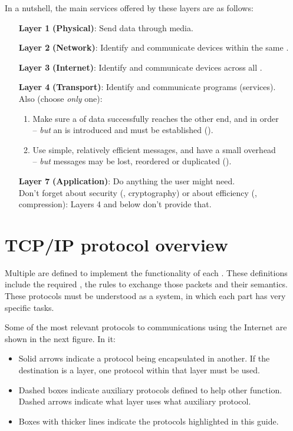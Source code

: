 In a nutshell, the main services offered by these layers are as follows:
\begin{enumerate}
\item[\textbf{Layer 1}] \textbf{(Physical)}: 
  Send  data through  media.
\item[\textbf{Layer 2}] \textbf{(Network)}:
  Identify and communicate devices within the same .
\item[\textbf{Layer 3}] \textbf{(Internet)}:
  Identify and communicate devices across all .
\item[\textbf{Layer 4}] \textbf{(Transport)}:
  Identify and communicate programs (services).\\
  Also (choose \textit{only} one):
  \begin{enumerate}[label=\alph*)]
   \item Make sure a  of data successfully reaches the other end, 
   and in order \\-- \textit{but} an  is introduced 
   and  must be established ().
     
   \item Use simple, relatively efficient messages, and have a small overhead\\
   -- \textit{but} messages may be lost, reordered or duplicated ().
  \end{enumerate}
\item[\textbf{Layer 7}] \textbf{(Application)}:
  Do anything the user might need. \\
  Don't forget about security (\eg, cryptography) 
  or about efficiency (\eg, compression): Layers 4 and below don't provide that.
\end{enumerate}

\section{TCP/IP protocol overview}

Multiple  are defined to implement the functionality
of each . These definitions include the required ,
the rules to exchange those packets and their semantics.
% 
These protocols must be understood as a system, in which each part has very specific tasks.

Some of the most relevant protocols to communications using the Internet 
are shown in the next figure. In it:
\begin{itemize}
\item Solid arrows indicate a protocol being encapsulated in another. 
  If the destination is a layer, one protocol within that layer must be used.

\item Dashed boxes indicate auxiliary protocols defined to help other function. 
Dashed arrows indicate what layer uses what auxiliary protocol.

\item Boxes with thicker lines indicate the protocols highlighted in this guide.
\end{itemize}

